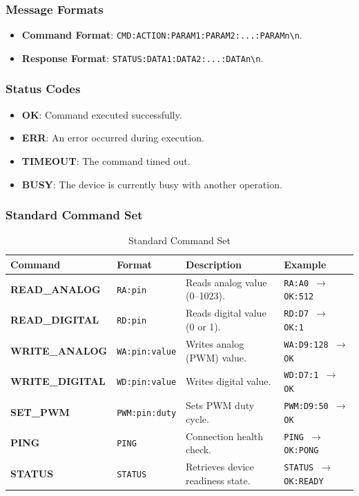 \documentclass[conference]{IEEEtran}
\begin{document}
\subsubsection{Message Formats}
\begin{itemize}
    \item \textbf{Command Format}: \texttt{CMD:ACTION:PARAM1:PARAM2:...:PARAMn\textbackslash n}.
    \item \textbf{Response Format}: \texttt{STATUS:DATA1:DATA2:...:DATAn\textbackslash n}.
\end{itemize}
\subsubsection{Status Codes}
\begin{itemize}
    \item \textbf{OK}: Command executed successfully.
    \item \textbf{ERR}: An error occurred during execution.
    \item \textbf{TIMEOUT}: The command timed out.
    \item \textbf{BUSY}: The device is currently busy with another operation.
\end{itemize}

\subsubsection{Standard Command Set}
\begin{table}[htbp]
\caption{Standard Command Set}
\begin{center}
\begin{tabular}{|p{1.5cm}|p{1.5cm}|p{2cm}|p{2cm}|}
\hline
\textbf{Command} & \textbf{Format} & \textbf{Description} & \textbf{Example} \\
\hline
\textbf{READ\_ANALOG} & \texttt{RA:pin} & Reads analog value (0--1023). & \texttt{RA:A0 $\rightarrow$ OK:512} \\
\hline
\textbf{READ\_DIGITAL} & \texttt{RD:pin} & Reads digital value (0 or 1). & \texttt{RD:D7 $\rightarrow$ OK:1} \\
\hline
\textbf{WRITE\_ANALOG} & \texttt{WA:pin:value} & Writes analog (PWM) value. & \texttt{WA:D9:128 $\rightarrow$ OK} \\
\hline
\textbf{WRITE\_DIGITAL} & \texttt{WD:pin:value} & Writes digital value. & \texttt{WD:D7:1 $\rightarrow$ OK} \\
\hline
\textbf{SET\_PWM} & \texttt{PWM:pin:duty} & Sets PWM duty cycle. & \texttt{PWM:D9:50 $\rightarrow$ OK} \\
\hline
\textbf{PING} & \texttt{PING} & Connection health check. & \texttt{PING $\rightarrow$ OK:PONG} \\
\hline
\textbf{STATUS} & \texttt{STATUS} & Retrieves device readiness state. & \texttt{STATUS $\rightarrow$ OK:READY} \\
\hline
\end{tabular}
\end{center}
\end{table}
\end{document}
